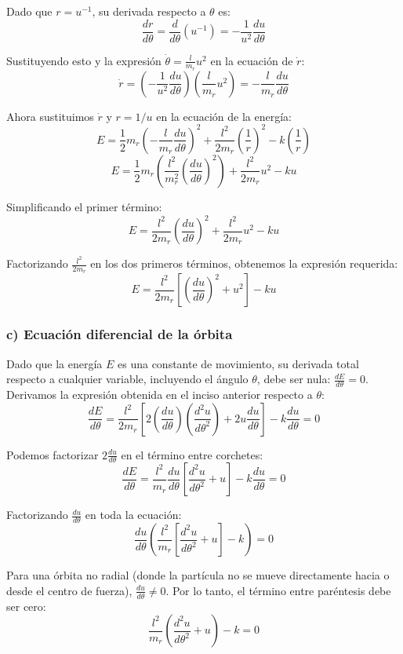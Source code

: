\documentclass[a4paper]{article}
\begin{document}
Dado que $r = u^{-1}$, su derivada respecto a $\theta$ es:
$$\frac{dr}{d\theta} = \frac{d}{d\theta}(u^{-1}) = -\frac{1}{u^2} \frac{du}{d\theta}$$

Sustituyendo esto y la expresión $\dot{\theta} = \frac{l}{m_r} u^2$ en la ecuación de $\dot{r}$:
$$\dot{r} = \left( -\frac{1}{u^2} \frac{du}{d\theta} \right) \left( \frac{l}{m_r} u^2 \right) = -\frac{l}{m_r} \frac{du}{d\theta}$$

Ahora sustituimos $\dot{r}$ y $r = 1/u$ en la ecuación de la energía:
$$E = \frac{1}{2}m_r \left( -\frac{l}{m_r} \frac{du}{d\theta} \right)^2 + \frac{l^2}{2m_r} \left(\frac{1}{r}\right)^2 - k\left(\frac{1}{r}\right)$$
$$E = \frac{1}{2}m_r \left( \frac{l^2}{m_r^2} \left(\frac{du}{d\theta}\right)^2 \right) + \frac{l^2}{2m_r} u^2 - ku$$

Simplificando el primer término:
$$E = \frac{l^2}{2m_r} \left(\frac{du}{d\theta}\right)^2 + \frac{l^2}{2m_r} u^2 - ku$$

Factorizando $\frac{l^2}{2m_r}$ en los dos primeros términos, obtenemos la expresión requerida:
$$E = \frac{l^2}{2m_r} \left[ \left(\frac{du}{d\theta}\right)^2 + u^2 \right] - ku$$

\subsubsection*{c) Ecuación diferencial de la órbita}

Dado que la energía $E$ es una constante de movimiento, su derivada total respecto a cualquier variable, incluyendo el ángulo $\theta$, debe ser nula: $\frac{dE}{d\theta} = 0$. Derivamos la expresión obtenida en el inciso anterior respecto a $\theta$:
$$\frac{dE}{d\theta} = \frac{l^2}{2m_r} \left[ 2 \left(\frac{du}{d\theta}\right) \left(\frac{d^2u}{d\theta^2}\right) + 2u \frac{du}{d\theta} \right] - k \frac{du}{d\theta} = 0$$

Podemos factorizar $2 \frac{du}{d\theta}$ en el término entre corchetes:
$$\frac{dE}{d\theta} = \frac{l^2}{m_r} \frac{du}{d\theta} \left[ \frac{d^2u}{d\theta^2} + u \right] - k \frac{du}{d\theta} = 0$$

Factorizando $\frac{du}{d\theta}$ en toda la ecuación:
$$\frac{du}{d\theta} \left( \frac{l^2}{m_r} \left[ \frac{d^2u}{d\theta^2} + u \right] - k \right) = 0$$

Para una órbita no radial (donde la partícula no se mueve directamente hacia o desde el centro de fuerza), $\frac{du}{d\theta} \neq 0$. Por lo tanto, el término entre paréntesis debe ser cero:
$$\frac{l^2}{m_r} \left( \frac{d^2u}{d\theta^2} + u \right) - k = 0$$
\end{document}
